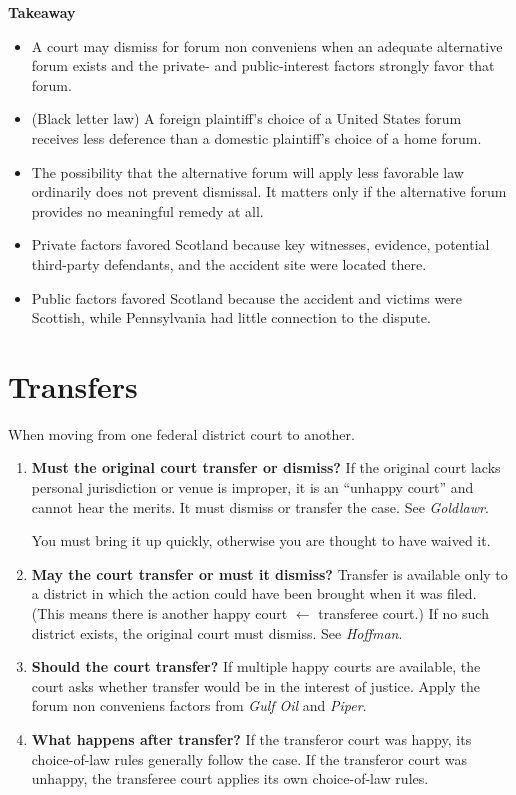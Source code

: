 \documentclass[11pt]{tex/lawoutline}
\begin{document}
{
\textbf{Takeaway}
\begin{itemize}
    \item A court may dismiss for forum non conveniens when an adequate alternative forum exists and the private- and public-interest factors strongly favor that forum.
    \item (Black letter law) A foreign plaintiff's choice of a United States forum receives less deference than a domestic plaintiff's choice of a home forum.
    \item The possibility that the alternative forum will apply less favorable law ordinarily does not prevent dismissal. It matters only if the alternative forum provides no meaningful remedy at all.
    \item Private factors favored Scotland because key witnesses, evidence, potential third-party defendants, and the accident site were located there.
    \item Public factors favored Scotland because the accident and victims were Scottish, while Pennsylvania had little connection to the dispute.
\end{itemize}
}

\section{Transfers}

When moving from one federal district court to another. 

{
\begin{enumerate}
    \item \textbf{Must the original court transfer or dismiss?} If the original court lacks personal jurisdiction or venue is improper, it is an ``unhappy court'' and cannot hear the merits. It must dismiss or transfer the case. See \textit{Goldlawr}. \par 
    You must bring it up quickly, otherwise you are thought to have waived it. 
    \item \textbf{May the court transfer or must it dismiss?} Transfer is available only to a district in which the action could have been brought when it was filed. (This means there is another happy court $\leftarrow$ transferee court.) If no such district exists, the original court must dismiss. See \textit{Hoffman}.
    \item \textbf{Should the court transfer?} If multiple happy courts are available, the court asks whether transfer would be in the interest of justice. Apply the forum non conveniens factors from \textit{Gulf Oil} and \textit{Piper}.
    \item \textbf{What happens after transfer?} If the transferor court was happy, its choice-of-law rules generally follow the case. If the transferor court was unhappy, the transferee court applies its own choice-of-law rules.
\end{enumerate}
}
\end{document}
